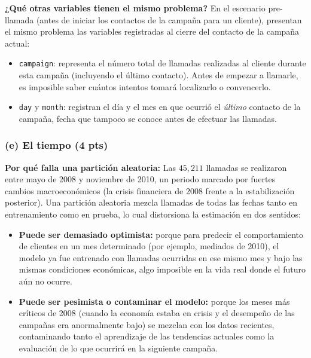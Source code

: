 \documentclass[11pt, letterpaper]{article}
\begin{document}
\textbf{¿Qué otras variables tienen el mismo problema?} En el escenario pre-llamada (antes de iniciar los contactos de la campaña para un cliente), presentan el mismo problema las variables registradas al cierre del contacto de la campaña actual:
\begin{itemize}
    \item \texttt{campaign}: representa el número total de llamadas realizadas al cliente durante esta campaña (incluyendo el último contacto). Antes de empezar a llamarle, es imposible saber cuántos intentos tomará localizarlo o convencerlo.
    \item \texttt{day} y \texttt{month}: registran el día y el mes en que ocurrió el \emph{último} contacto de la campaña, fecha que tampoco se conoce antes de efectuar las llamadas.
\end{itemize}

\subsubsection*{(e) El tiempo (4 pts)}

\textbf{Por qué falla una partición aleatoria:} Las $45{,}211$ llamadas se realizaron entre mayo de 2008 y noviembre de 2010, un periodo marcado por fuertes cambios macroeconómicos (la crisis financiera de 2008 frente a la estabilización posterior). Una partición aleatoria mezcla llamadas de todas las fechas tanto en entrenamiento como en prueba, lo cual distorsiona la estimación en dos sentidos:
\begin{itemize}
    \item \textbf{Puede ser demasiado optimista:} porque para predecir el comportamiento de clientes en un mes determinado (por ejemplo, mediados de 2010), el modelo ya fue entrenado con llamadas ocurridas en ese mismo mes y bajo las mismas condiciones económicas, algo imposible en la vida real donde el futuro aún no ocurre.
    \item \textbf{Puede ser pesimista o contaminar el modelo:} porque los meses más críticos de 2008 (cuando la economía estaba en crisis y el desempeño de las campañas era anormalmente bajo) se mezclan con los datos recientes, contaminando tanto el aprendizaje de las tendencias actuales como la evaluación de lo que ocurrirá en la siguiente campaña.
\end{itemize}
\end{document}
